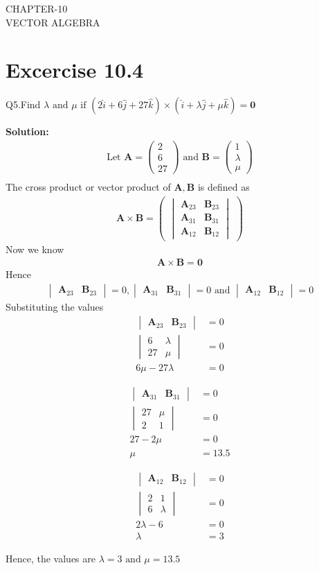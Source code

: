 \documentclass[12pt]{article}
\newcommand{\mydet}[1]{\ensuremath{\begin{vmatrix}#1\end{vmatrix}}}
\newcommand{\solution}{\noindent \textbf{Solution: }}
\newcommand{\myvec}[1]{\ensuremath{\begin{pmatrix}#1\end{pmatrix}}}
\let\vec\mathbf
\begin{document}
\begin{center}
\textbf\large{CHAPTER-10 \\ VECTOR ALGEBRA}

\end{center}
\section*{Excercise 10.4}

Q5.Find $\lambda \text{ and } \mu \text{ if } (2\hat{i}+6\hat{j}+27\hat{k}) \times (\hat{i}+\lambda \hat{j}+\mu \hat{k})=\vec{0}$

\solution
\begin{align}
	\text{Let } \vec{A} = \myvec{2\\6\\27} \text{ and } \vec{B} = \myvec{1\\ \lambda \\ \mu}\\
\end{align}
The cross product or vector product of $\vec{A},\vec{B}$ is defined as
\begin{align}
	\vec{A} \times \vec{B} = \myvec{\mydet{\vec{A}_{23}&\vec{B}_{23}\\\vec{A}_{31}&\vec{B}_{31}\\\vec{A}_{12}&\vec{B}_{12}}}
\end{align}
Now we know
\begin{align}
	\vec{A} \times \vec{B} = \vec{0}
\end{align}
Hence
\begin{align}
	\mydet{\vec{A}_{23}&\vec{B}_{23}}=0,
	\mydet{\vec{A}_{31}&\vec{B}_{31}}=0 \text{ and }
	\mydet{\vec{A}_{12}&\vec{B}_{12}}=0
\end{align}
Substituting the values
\begin{align}
	\mydet{\vec{A}_{23}&\vec{B}_{23}}&=0\\
	\mydet{6&\lambda\\27&\mu}&=0\\
	6\mu-27\lambda&=0
\end{align}

\begin{align}
	\mydet{\vec{A}_{31}&\vec{B}_{31}}&=0\\
	\mydet{27&\mu\\2&1}&=0\\
	27-2\mu&=0\\
	\mu&=13.5
\end{align}

\begin{align}
	\mydet{\vec{A}_{12}&\vec{B}_{12}}&=0\\
	\mydet{2&1\\6&\lambda}&=0\\
	2\lambda-6&=0\\
	\lambda&=3
\end{align}

Hence, the values are $\lambda = 3 \text{ and } \mu = 13.5$
\end{document}
